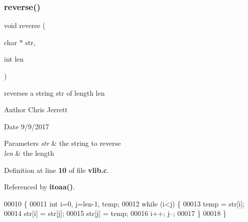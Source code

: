 \subsubsection{reverse()}
{\footnotesize\ttfamily void reverse (\begin{DoxyParamCaption}\item[{char $\ast$}]{str,  }\item[{int}]{len }\end{DoxyParamCaption})}



reverses a string \textquotesingle{}str\textquotesingle{} of length \textquotesingle{}len\textquotesingle{} 

\begin{DoxyAuthor}{Author}
Chris Jerrett 
\end{DoxyAuthor}
\begin{DoxyDate}{Date}
9/9/2017 
\end{DoxyDate}

\begin{DoxyParams}{Parameters}
{\em str} & the string to reverse \\
\hline
{\em len} & the length \\
\hline
\end{DoxyParams}


Definition at line \textbf{ 10} of file \textbf{ vlib.\+c}.



Referenced by \textbf{ itoaa()}.


\begin{DoxyCode}
00010                                  \{
00011     \textcolor{keywordtype}{int} i=0, j=len-1, temp;
00012     \textcolor{keywordflow}{while} (i<j) \{
00013         temp = str[i];
00014         str[i] = str[j];
00015         str[j] = temp;
00016         i++; j--;
00017     \}
00018 \}
\end{DoxyCode}
